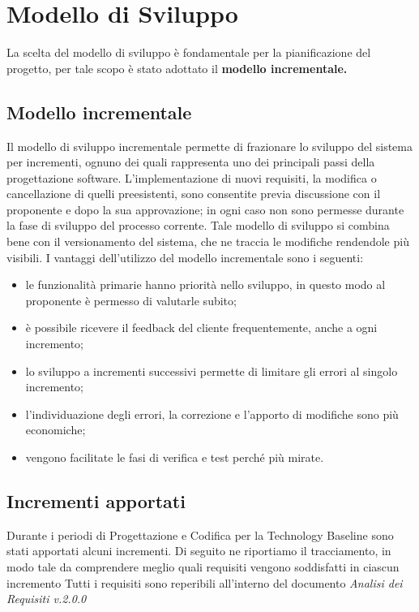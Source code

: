 \section{Modello di Sviluppo}
La scelta del modello di sviluppo è fondamentale per la pianificazione del progetto, per tale scopo è stato adottato il \textbf{modello incrementale.}

\subsection{Modello incrementale}
Il modello di sviluppo incrementale permette di frazionare lo sviluppo del sistema per incrementi, ognuno dei quali rappresenta uno dei principali passi della progettazione software.
L'implementazione di nuovi requisiti, la modifica o cancellazione di quelli preesistenti, sono consentite previa discussione con il proponente e dopo la sua approvazione; in ogni caso non sono permesse durante la fase di sviluppo del processo corrente.
Tale modello di sviluppo si combina bene con il versionamento del sistema, che ne traccia le modifiche rendendole più visibili.
I vantaggi dell'utilizzo del modello incrementale sono i seguenti:
\begin{itemize}
    \item le funzionalità primarie hanno priorità nello sviluppo, in questo modo al proponente è permesso di valutarle subito;
    \item è possibile ricevere il feedback del cliente frequentemente, anche a ogni incremento;
    \item lo sviluppo a incrementi successivi permette di limitare gli errori al singolo incremento;
    \item l'individuazione degli errori, la correzione e l'apporto di modifiche sono più economiche;
    \item vengono facilitate le fasi di verifica e test perché più mirate.
\end{itemize}

\subsection{Incrementi apportati}
Durante i periodi di Progettazione e Codifica per la Technology Baseline sono stati apportati alcuni incrementi. Di seguito ne riportiamo il tracciamento, in modo tale da comprendere meglio quali requisiti vengono soddisfatti in ciascun incremento
\newline
Tutti i requisiti sono reperibili all'interno del documento \textit{Analisi dei Requisiti v.2.0.0}

